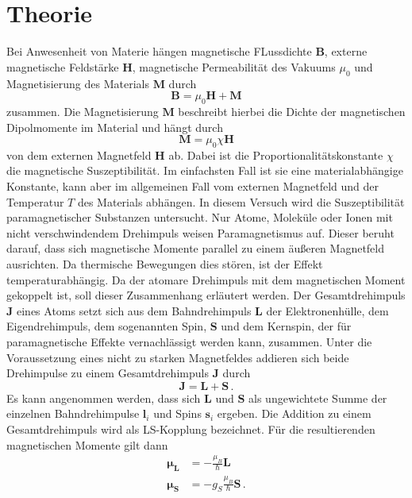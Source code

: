 \section{Theorie}
\label{sec:Theorie}
Bei Anwesenheit von Materie hängen magnetische FLussdichte $\symbf{B}$, externe
magnetische Feldstärke $\symbf{H}$, magnetische Permeabilität des Vakuums $\mu_0$
und Magnetisierung des Materials $\symbf{M}$ durch
\begin{equation}
  \symbf{B} = \mu_0 \symbf{H} + \symbf{M}
  \label{eqn:bhm}
\end{equation}
zusammen. Die Magnetisierung $\symbf{M}$ beschreibt hierbei die Dichte der
magnetischen Dipolmomente im Material und hängt durch
\begin{equation}
  \symbf{M} = \mu_0 \chi \symbf{H}
  \label{eqn:mchih}
\end{equation}
von dem externen Magnetfeld $\symbf{H}$ ab. Dabei ist die Proportionalitätskonstante
$\chi$ die magnetische Suszeptibilität. Im einfachsten Fall ist sie eine materialabhängige
Konstante, kann aber im allgemeinen Fall vom externen Magnetfeld und der Temperatur $T$
des Materials abhängen.
In diesem Versuch wird die Suszeptibilität paramagnetischer Substanzen untersucht.
Nur Atome, Moleküle oder Ionen mit nicht verschwindendem Drehimpuls weisen
Paramagnetismus auf. Dieser beruht darauf, dass sich magnetische Momente parallel zu
einem äußeren Magnetfeld ausrichten. Da thermische Bewegungen dies stören, ist der Effekt
temperaturabhängig. Da der atomare Drehimpuls mit dem magnetischen Moment gekoppelt ist,
soll dieser Zusammenhang erläutert werden.
Der Gesamtdrehimpuls $\symbf{J}$ eines Atoms setzt sich aus dem Bahndrehimpuls
$\symbf{L}$ der Elektronenhülle, dem Eigendrehimpuls, dem sogenannten Spin, $\symbf{S}$
und dem Kernspin, der für paramagnetische Effekte vernachlässigt werden kann, zusammen.
Unter die Voraussetzung eines nicht zu starken Magnetfeldes addieren sich beide
Drehimpulse zu einem Gesamtdrehimpuls $\symbf{J}$ durch
\begin{equation}
  \symbf{J} = \symbf{L} + \symbf{S}\,.
  \label{eqn:ls}
\end{equation}
Es kann angenommen werden, dass sich $\symbf{L}$ und $\symbf{S}$ als ungewichtete
Summe der einzelnen Bahndrehimpulse $\symbf{l}_i$ und Spins $\symbf{s}_i$ ergeben.
Die Addition zu einem Gesamtdrehimpuls wird als LS-Kopplung bezeichnet. Für die
resultierenden magnetischen Momente gilt dann
\begin{align}
  \symbf{\mu_L} &= - \frac{\mu_B}{\hbar} \symbf{L} \,\\
  \symbf{\mu_S} &= - g_S \frac{\mu_B}{\hbar} \symbf{S} \,.
  \label{eqn:mulmus}
\end{align}
